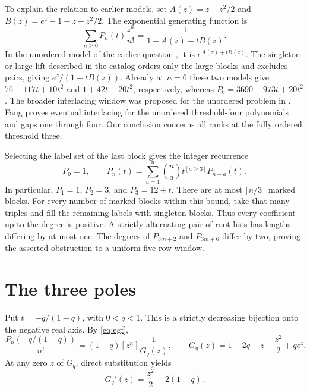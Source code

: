 \documentclass[11pt]{article}
\begin{document}
To explain the relation to earlier models, set \(A(z)=z+z^2/2\) and
\(B(z)=e^z-1-z-z^2/2\). The exponential generating function is
\begin{equation}\label{eq:egf}
  \sum_{n\ge0}P_n(t)\frac{z^n}{n!}
  =\frac{1}{1-A(z)-tB(z)}.
\end{equation}
In the unordered model of the earlier question \cite{mo}, it is
\(e^{A(z)+tB(z)}\). The singleton-or-large lift described in the
catalog \cite{related} orders only the large blocks and excludes
pairs, giving \(e^z/(1-tB(z))\). Already at \(n=6\) these two models
give \(76+117t+10t^2\) and \(1+42t+20t^2\), respectively, whereas
\(P_6=3690+973t+20t^2\). The broader interlacing window was proposed
for the unordered problem in \cite{mo}. Fang \cite[Theorem~1]{fang}
proves eventual interlacing for the unordered threshold-four
polynomials and gaps one through four. Our conclusion concerns all
ranks at the fully ordered threshold three.

Selecting the label set of the last block gives the integer recurrence
\begin{equation}\label{eq:last}
 P_0=1,\qquad P_n(t)=\sum_{a=1}^{n}\binom na t^{[a\ge3]}P_{n-a}(t).
\end{equation}
In particular, \(P_1=1\), \(P_2=3\), and \(P_3=12+t\).
There are at most \(\lfloor n/3\rfloor\) marked blocks. For every
number of marked blocks within this bound, take that many triples and
fill the remaining labels with singleton blocks. Thus every
coefficient up to the degree is positive. A strictly alternating
pair of root lists has lengths differing by at most one. The degrees
of \(P_{3m+2}\) and \(P_{3m+6}\) differ by two, proving the asserted
obstruction to a uniform five-row window.

\section{The three poles}

Put \(t=-q/(1-q)\), with \(0<q<1\). This is a strictly decreasing
bijection onto the negative real axis. By \eqref{eq:egf},
\begin{equation}\label{eq:G}
 \frac{P_n(-q/(1-q))}{n!}=(1-q)[z^n]\frac{1}{G_q(z)},\qquad
 G_q(z)=1-2q-z-\frac{z^2}{2}+qe^z .
\end{equation}
At any zero \(z\) of \(G_q\), direct substitution yields
\begin{equation}\label{eq:deriv}
 G_q'(z)=\frac{z^2}{2}-2(1-q).
\end{equation}
\end{document}
